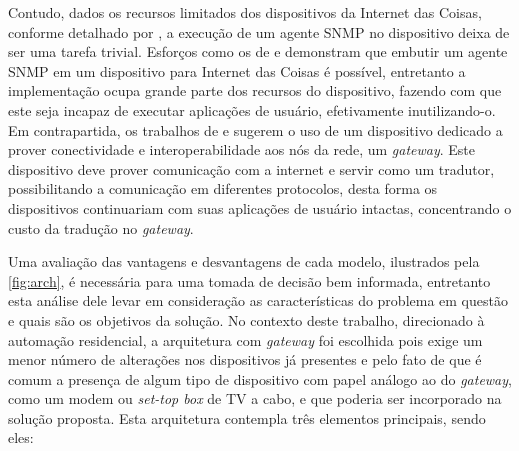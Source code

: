 \documentclass[twoside,english,brazilian]{UNISINOSmonografia}
\begin{document}
Contudo, dados os recursos limitados dos dispositivos da Internet das Coisas, 
conforme detalhado por , a execução de um agente SNMP 
no dispositivo deixa de ser uma tarefa trivial.
Esforços como os de  e  demonstram 
que embutir um agente SNMP em um dispositivo para Internet das Coisas é 
possível, entretanto a implementação ocupa grande parte dos recursos do 
dispositivo, fazendo com que este seja incapaz de executar aplicações de 
usuário, efetivamente inutilizando-o.
Em contrapartida, os trabalhos de  e 
 sugerem o uso de um dispositivo dedicado a prover 
conectividade e interoperabilidade aos nós da rede, um \textit{gateway}.
Este dispositivo deve prover comunicação com a internet e servir como um 
tradutor, possibilitando a comunicação em diferentes protocolos, desta forma 
os dispositivos continuariam com suas aplicações de usuário intactas, 
concentrando o custo da tradução no \textit{gateway}.


Uma avaliação das vantagens e desvantagens de cada modelo, 
ilustrados pela \autoref{fig:arch}, 
é necessária para uma tomada de decisão bem informada, entretanto esta análise 
dele levar em consideração as características do problema em questão e quais 
são os objetivos da solução.
No contexto deste trabalho, direcionado à automação residencial, a arquitetura 
com \textit{gateway} foi escolhida pois exige um menor número de alterações 
nos dispositivos já presentes e pelo fato de que é comum a presença de algum 
tipo de dispositivo com papel análogo ao do \textit{gateway}, como um 
modem ou \textit{set-top box} de TV a cabo, e que poderia ser incorporado na 
solução proposta.
Esta arquitetura contempla três elementos principais, sendo eles:
\end{document}
